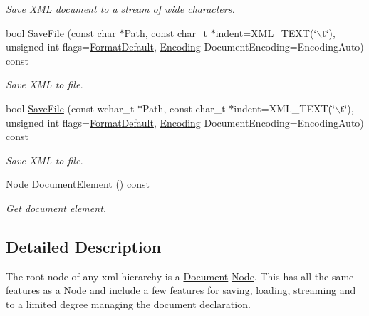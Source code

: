 \begin{DoxyCompactItemize}
\begin{DoxyCompactList}\small\item\em Save XML document to a stream of wide characters. \item\end{DoxyCompactList}\item 
bool \hyperlink{classphys_1_1xml_1_1Document_a888042e75f6dafe4d79107a8b53ae31e}{SaveFile} (const char $\ast$Path, const char\_\-t $\ast$indent=XML\_\-TEXT(\char`\"{}$\backslash$t\char`\"{}), unsigned int flags=\hyperlink{namespacephys_1_1xml_a08bf6aab51f79929d9097706a5e64408}{FormatDefault}, \hyperlink{namespacephys_1_1xml_a420f5de782438f88160321385bea2015}{Encoding} DocumentEncoding=EncodingAuto) const 
\begin{DoxyCompactList}\small\item\em Save XML to file. \item\end{DoxyCompactList}\item 
bool \hyperlink{classphys_1_1xml_1_1Document_a56b9dc49e83adfd09f35e8e99d8c0ca0}{SaveFile} (const wchar\_\-t $\ast$Path, const char\_\-t $\ast$indent=XML\_\-TEXT(\char`\"{}$\backslash$t\char`\"{}), unsigned int flags=\hyperlink{namespacephys_1_1xml_a08bf6aab51f79929d9097706a5e64408}{FormatDefault}, \hyperlink{namespacephys_1_1xml_a420f5de782438f88160321385bea2015}{Encoding} DocumentEncoding=EncodingAuto) const 
\begin{DoxyCompactList}\small\item\em Save XML to file. \item\end{DoxyCompactList}\item 
\hyperlink{classphys_1_1xml_1_1Node}{Node} \hyperlink{classphys_1_1xml_1_1Document_a93d8521e3241281e15f77cf7568d5754}{DocumentElement} () const 
\begin{DoxyCompactList}\small\item\em Get document element. \item\end{DoxyCompactList}\end{DoxyCompactItemize}


\subsection{Detailed Description}
The root node of any xml hierarchy is a \hyperlink{classphys_1_1xml_1_1Document}{Document} \hyperlink{classphys_1_1xml_1_1Node}{Node}. This has all the same features as a \hyperlink{classphys_1_1xml_1_1Node}{Node} and include a few features for saving, loading, streaming and to a limited degree managing the document declaration. 

